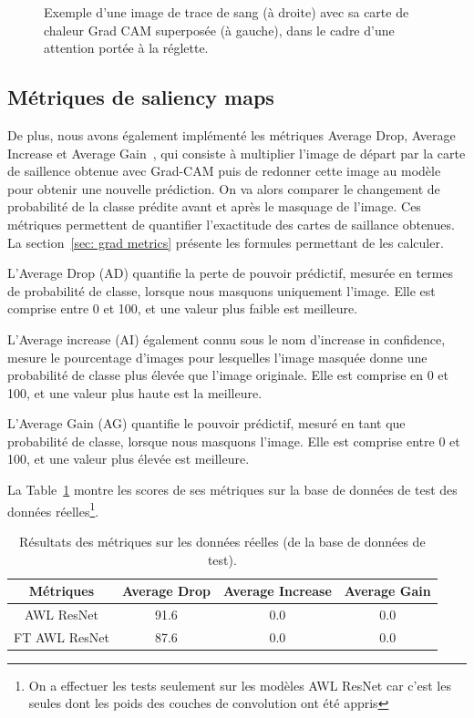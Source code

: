 \begin{figure}[ht]
\begin{subfigure}{0.35\linewidth}
    \end{subfigure}
    \caption{Exemple d'une image de trace de sang (à droite) avec sa carte de chaleur Grad CAM superposée (à gauche), dans le cadre d'une attention portée à la réglette.}
    \label{fig:grad_cam reglette}
\end{figure}

\subsection{Métriques de saliency maps}
De plus, nous avons également implémenté les métriques Average Drop, Average Increase et Average Gain~\cite{opticam}, qui consiste à multiplier l'image de départ par la carte de saillence obtenue avec Grad-CAM puis de redonner cette image au modèle pour obtenir une nouvelle prédiction. On va alors comparer le changement de probabilité de la classe prédite avant et après le masquage de l'image. Ces métriques permettent de quantifier l'exactitude des cartes de saillance obtenues. La section~\ref{sec: grad metrics} présente les formules permettant de les calculer.

L'Average Drop (AD) quantifie la perte de pouvoir prédictif, mesurée en termes de probabilité de classe, lorsque nous masquons uniquement l'image. Elle est comprise entre 0 et 100, et une valeur plus faible est meilleure.

L'Average increase (AI) également connu sous le nom d'increase in confidence, mesure le pourcentage d'images pour lesquelles l'image masquée donne une probabilité de classe plus élevée que l'image originale. Elle est comprise en 0 et 100, et une valeur plus haute est la meilleure.

L'Average Gain (AG) quantifie le pouvoir prédictif, mesuré en tant que probabilité de classe, lorsque nous masquons l'image. Elle est comprise entre 0 et 100, et une valeur plus élevée est meilleure.

La Table~\ref{tab:saliency_results} montre les scores de ses métriques sur la base de données de test des données réelles\footnote{On a effectuer les tests seulement sur les modèles AWL ResNet car c'est les seules dont les poids des couches de convolution ont été appris}.

\begin{table}[ht]
    \centering
    \begin{tabular}{cccc}
        \toprule
        Métriques & Average Drop & Average Increase & Average Gain \\
        \midrule
        AWL ResNet & 91.6 & 0.0& 0.0\\
        FT AWL ResNet & 87.6 & 0.0 & 0.0\\
        \bottomrule
        \end{tabular}
    \caption{Résultats des métriques sur les données réelles (de la base de données de test).}
    \label{tab:saliency_results}
\end{table}

